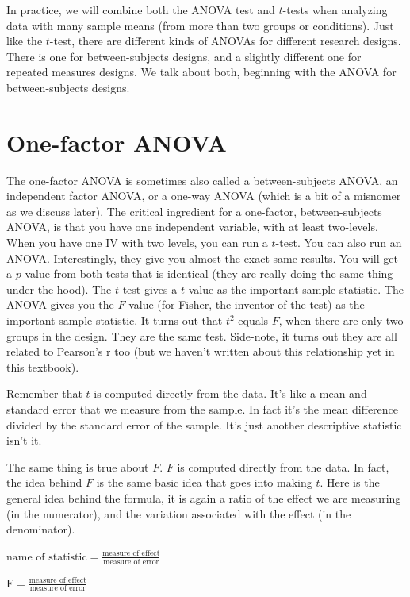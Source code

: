 \documentclass[
]{book}
\begin{document}
In practice, we will combine both the ANOVA test and \(t\)-tests when analyzing data with many sample means (from more than two groups or conditions). Just like the \(t\)-test, there are different kinds of ANOVAs for different research designs. There is one for between-subjects designs, and a slightly different one for repeated measures designs. We talk about both, beginning with the ANOVA for between-subjects designs.

\hypertarget{one-factor-anova}{%
\section{One-factor ANOVA}\label{one-factor-anova}}

The one-factor ANOVA is sometimes also called a between-subjects ANOVA, an independent factor ANOVA, or a one-way ANOVA (which is a bit of a misnomer as we discuss later). The critical ingredient for a one-factor, between-subjects ANOVA, is that you have one independent variable, with at least two-levels. When you have one IV with two levels, you can run a \(t\)-test. You can also run an ANOVA. Interestingly, they give you almost the exact same results. You will get a \(p\)-value from both tests that is identical (they are really doing the same thing under the hood). The \(t\)-test gives a \(t\)-value as the important sample statistic. The ANOVA gives you the \(F\)-value (for Fisher, the inventor of the test) as the important sample statistic. It turns out that \(t^2\) equals \(F\), when there are only two groups in the design. They are the same test. Side-note, it turns out they are all related to Pearson's r too (but we haven't written about this relationship yet in this textbook).

Remember that \(t\) is computed directly from the data. It's like a mean and standard error that we measure from the sample. In fact it's the mean difference divided by the standard error of the sample. It's just another descriptive statistic isn't it.

The same thing is true about \(F\). \(F\) is computed directly from the data. In fact, the idea behind \(F\) is the same basic idea that goes into making \(t\). Here is the general idea behind the formula, it is again a ratio of the effect we are measuring (in the numerator), and the variation associated with the effect (in the denominator).

\(\text{name of statistic} = \frac{\text{measure of effect}}{\text{measure of error}}\)

\(\text{F} = \frac{\text{measure of effect}}{\text{measure of error}}\)
\end{document}
